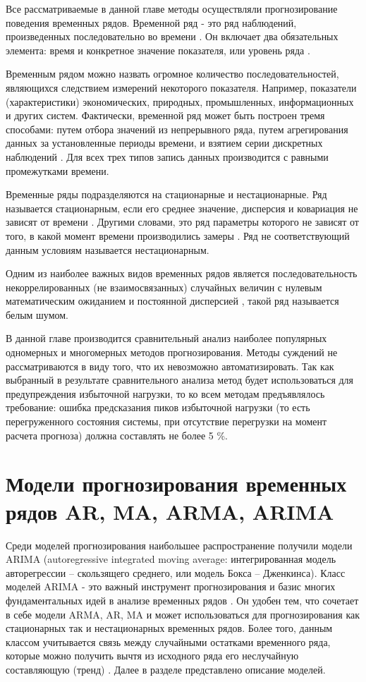 \documentclass[a4paper,14pt,russian]{extreport}
\begin{document}
Все рассматриваемые в данной главе методы осуществляли прогнозирование 
поведения временных рядов. Временной ряд - это ряд наблюдений, 
произведенных последовательно во времени \cite{chatfield2000, armstrong1999, 
brockwell2002, box2008, wolters2007, hyndman2012}. Он включает два 
обязательных элемента: время и конкретное значение показателя, или уровень 
ряда \cite{popov2006, afanasyev2001}. 

Временным рядом можно назвать огромное количество последовательностей, 
являющихся следствием измерений некоторого показателя. Например, 
показатели (характеристики) экономических, природных, промышленных, 
информационных и других систем. Фактически, временной ряд может быть 
построен тремя способами: путем отбора значений из непрерывного ряда, путем 
агрегирования данных за установленные периоды времени, и взятием серии 
дискретных наблюдений \cite{chatfield2000, box2008}. Для всех трех типов запись 
данных производится с равными промежутками времени.

Временные ряды подразделяются на стационарные и нестационарные. Ряд 
называется стационарным, если его среднее значение, дисперсия и ковариация 
не зависят от времени \cite{popov2006}. Другими словами, это ряд параметры 
которого не зависят от того, в какой момент времени производились замеры 
\cite{hyndman2012}. Ряд не соответствующий данным условиям называется 
нестационарным.

Одним из наиболее важных видов временных рядов является 
последовательность некоррелированных (не взаимосвязанных) случайных 
величин с нулевым математическим ожиданием и постоянной дисперсией 
\cite{fuller1996, runova2013}, такой ряд называется белым шумом.

В данной главе производится сравнительный анализ наиболее популярных 
одномерных и многомерных методов прогнозирования. Методы суждений не 
рассматриваются в виду того, что их невозможно автоматизировать. Так как 
выбранный в результате сравнительного анализа метод будет использоваться 
для предупреждения избыточной нагрузки, то ко всем методам предъявлялось 
требование: ошибка предсказания пиков избыточной нагрузки (то есть 
перегруженного состояния системы, при отсутствие перегрузки на момент 
расчета прогноза) должна составлять не более 5 \%. 

\section{Модели прогнозирования временных рядов AR, MA, ARMA, ARIMA} 
Среди моделей прогнозирования наибольшее распространение получили 
модели ARIMA (autoregressive integrated moving average: интегрированная модель 
авторегрессии -- скользящего среднего, или модель Бокса -- Дженкинса). Класс 
моделей ARIMA - это важный инструмент прогнозирования и базис многих 
фундаментальных идей в анализе временных рядов \cite{chatfield2000}. Он 
удобен тем, что сочетает в себе модели ARMA, AR, MA и может использоваться 
для прогнозирования как стационарных так и нестационарных временных рядов. 
Более того, данным классом учитывается связь между случайными остатками 
временного ряда, которые можно получить вычтя из исходного ряда его 
неслучайную составляющую (тренд) \cite{tihonov2006}. Далее в разделе 
представлено описание моделей.
\end{document}
